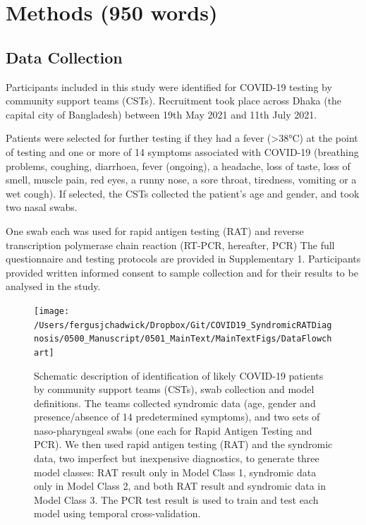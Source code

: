 \documentclass[]{elsarticle} %
\begin{document}
\hypertarget{methods-950-words}{%
\section{Methods (950 words)}\label{methods-950-words}}

\hypertarget{data-collection}{%
\subsection{Data Collection}\label{data-collection}}

Participants included in this study were identified for COVID-19 testing by community support teams (CSTs).
Recruitment took place across Dhaka (the capital city of Bangladesh) between 19th May 2021 and 11th July 2021.

Patients were selected for further testing if they had a fever (\textgreater38°C) at the point of testing and one or more of 14 symptoms associated with COVID-19 (breathing problems, coughing, diarrhoea, fever (ongoing), a headache, loss of taste, loss of smell, muscle pain, red eyes, a runny nose, a sore throat, tiredness, vomiting or a wet cough).
If selected, the CSTs collected the patient's age and gender, and took two nasal swabs.

One swab each was used for rapid antigen testing (RAT) and reverse transcription polymerase chain reaction (RT-PCR, hereafter, PCR)
The full questionnaire and testing protocols are provided in Supplementary 1.
Participants provided written informed consent to sample collection and for their results to be analysed in the study.

\begin{figure}
\texttt{[image: /Users/fergusjchadwick/Dropbox/Git/COVID19\_SyndromicRATDiagnosis/0500\_Manuscript/0501\_MainText/MainTextFigs/DataFlowchart]} \caption{Schematic description of identification of likely COVID-19 patients by community support teams (CSTs), swab collection and model definitions. The teams collected syndromic data (age, gender and presence/absence of 14 predetermined symptoms), and two sets of naso-pharyngeal swabs (one each for Rapid Antigen Testing and PCR). We then used rapid antigen testing (RAT) and the syndromic data, two imperfect but inexpensive diagnostics, to generate three model classes: RAT result only in Model Class 1, syndromic data only in Model Class 2, and both RAT result and syndromic data in Model Class 3. The PCR test result is used to train and test each model using temporal cross-validation.}\label{fig:data-flowchart}
\end{figure}
\end{document}

